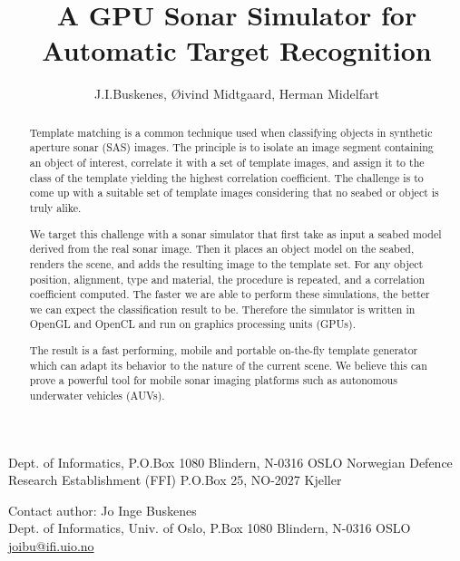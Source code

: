 \documentclass[
   UAM                                          %
 , 12pt                                         %
 , bibtex                                       %
 , layout
]{common/mytemplate}
\begin{document}
% 

\pagestyle{plain}



\title{A GPU Sonar Simulator for Automatic Target Recognition}%
%
\author{J.I.Buskenes\firstAddress, \O{}ivind Midtgaard\secondAddress, Herman Midelfart\secondAddress}%
%
\begin{contact}
  \firstAddress Dept. of Informatics, P.O.Box 1080 Blindern, N-0316 OSLO
  \secondAddress Norwegian Defence Research Establishment (FFI) P.O.Box 25, NO-2027 Kjeller
\end{contact}%
%
\begin{contact}
Contact author: Jo Inge Buskenes\\
Dept. of Informatics, Univ. of Oslo, P.Box 1080 Blindern, N-0316 OSLO\\
\href{mailto:joibu@ifi.uio.no}{joibu@ifi.uio.no}
\end{contact}%
%
\begin{abstract}
Template matching is a common technique used when classifying objects in synthetic aperture sonar (SAS) images. The principle is to isolate an image segment containing an object of interest, correlate it with a set of template images, and assign it to the class of the template yielding the highest correlation coefficient. The challenge is to come up with a suitable set of template images considering that no seabed or object is truly alike.

We target this challenge with a sonar simulator that first take as input a seabed model derived from the real sonar image. Then it places an object model on the seabed, renders the scene, and adds the resulting image to the template set. For any object position, alignment, type and material, the procedure is repeated, and a correlation coefficient computed. The faster we are able to perform these simulations, the better we can expect the classification result to be. Therefore the simulator is written in OpenGL and OpenCL and run on graphics processing units (GPUs).

The result is a fast performing, mobile and portable on-the-fly template generator which can adapt its behavior to the nature of the current scene. We believe this can prove a powerful tool for mobile sonar imaging platforms such as autonomous underwater vehicles (AUVs).
\end{abstract}%
%
\end{document}
